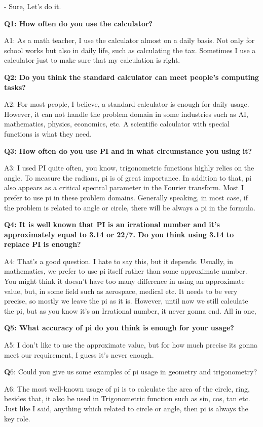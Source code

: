 \documentclass[12pt]{report}
\begin{document}
{- Sure, Let's do it.

\textbf {Q1: How often do you use the calculator?}

A1: As a math teacher, I use the calculator almost on a daily basis. Not only for school works but also in daily life, such as calculating the tax. Sometimes I use a calculator just to make sure that my calculation is right.

\textbf {Q2: Do you think the standard calculator can meet people's computing tasks?}

A2: For most people, I believe, a standard calculator is enough for daily usage.  However, it can not handle the problem domain in some industries such as AI, mathematics, physics, economics, etc. A scientific calculator with special functions is what they need. 

\textbf {Q3: How often do you use PI and in what circumstance you using it?}

A3: I used PI quite often, you know, trigonometric functions highly relies on the angle. To measure the radians, pi is of great importance. In addition to that, pi also appears as a critical spectral parameter in the Fourier transform. Most I prefer to use pi in these problem domains. Generally speaking, in most case, if the problem is related to angle or circle, there will be always a pi in the formula.

\textbf {Q4: It is well known that PI is an irrational number and it’s approximately equal to 3.14 or 22/7. Do you think using 3.14 to replace PI is enough?}


A4: That's a good question.  I hate to say this, but it depends. Usually, in mathematics, we prefer to use pi itself rather than some approximate number. You might think it doesn't have too many difference in using an approximate value, but, in some field such as aerospace, medical etc. It needs to be very precise, so mostly we leave the pi as it is. However, until now we still calculate the pi, but as you know it's an Irrational number, it never gonna end. All in one,  

\textbf {Q5: What accuracy of pi do you think is enough for your usage?} 

A5: I don't like to use the approximate value, but for how much precise its gonna meet our requirement, I guess it's never enough.

\textbf Q6: Could you give us some examples of pi usage in geometry and trigonometry? 

A6: The most well-known usage of pi is to calculate the area of the circle, ring, besides that,  it also be used in Trigonometric function such as sin, cos, tan etc. Just like I said, anything which related to circle or angle, then pi is always the key role.

}
\end{document}

